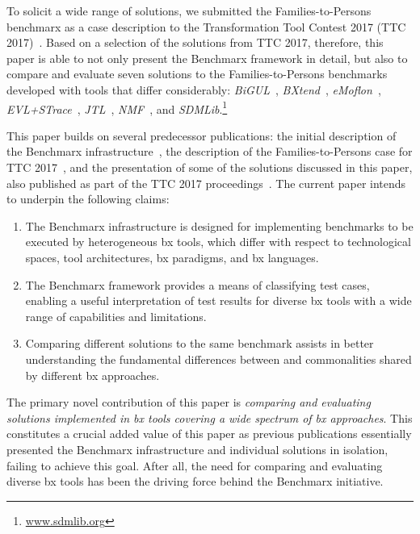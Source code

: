 To solicit a wide range of solutions, we submitted the Families-to-Persons benchmarx as a case description to the Transformation Tool Contest 2017 (TTC 2017)~\cite{Anjorin2017a}.
Based on a selection of the solutions from TTC 2017, therefore, this paper is able to not only present the Benchmarx framework in detail, but also to compare and evaluate seven solutions to the Families-to-Persons benchmarks developed with tools that differ considerably: 
\emph{BiGUL}~\cite{PEPM2016-Ko}, 
\emph{BXtend}~\cite{MODELSWARD2018-Buchmann}, 
\emph{eMoflon}~\cite{Leblebici2014a}, 
\emph{EVL+STrace}~\cite{IST2018-Samimi}, 
\emph{JTL}~\cite{SLE2010-Cicchetti}, 
\emph{NMF}~\cite{SoSyM2017-Hinkel},
and 
\emph{SDMLib}.\footnote{\url{www.sdmlib.org}}

This paper builds on several predecessor publications: the initial description of the Benchmarx infrastructure~\cite{Anjorin2017}, the description of the Families-to-Persons case for TTC 2017~\cite{Anjorin2017a}, and the presentation of some of the solutions discussed in this paper, also published as part of the TTC 2017 proceedings~\cite{Hinkel2017,Samimi-Dehkordi2017,Zundorf2017}. 
%
The current paper intends to underpin the following claims:

\begin{enumerate}
	\item The Benchmarx infrastructure is designed for implementing benchmarks to be executed by heterogeneous bx tools, which differ with respect to technological spaces, tool architectures, bx paradigms, and bx languages.
	\item The Benchmarx framework provides a means of classifying test cases, enabling a useful interpretation of test results for diverse bx tools with a wide range of capabilities and limitations.  
	\item Comparing different solutions to the same benchmark assists in better understanding the fundamental differences between and commonalities shared by different bx approaches.
\end{enumerate}

The primary novel contribution of this paper is \emph{comparing and evaluating solutions implemented in bx tools covering a wide spectrum of bx approaches}.
This constitutes a crucial added value of this paper as previous publications essentially presented the Benchmarx infrastructure and individual solutions in isolation, failing to achieve this goal. 
After all, the need for comparing and evaluating diverse bx tools has been the driving force behind the Benchmarx initiative.


